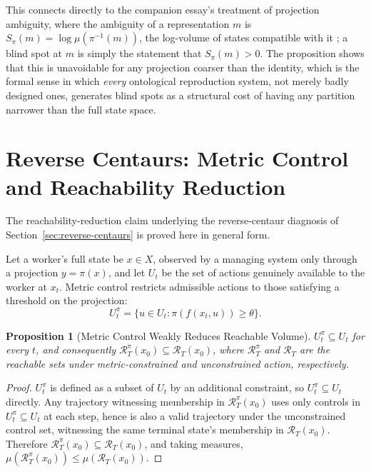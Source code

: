 \documentclass[11pt]{article}
\theoremstyle{plain}
\newtheorem{proposition}{Proposition}[section]
\begin{document}
\noindent This connects directly to the companion essay's treatment of projection ambiguity, where the ambiguity of a representation $m$ is $S_\pi(m) = \log \mu(\pi^{-1}(m))$, the log-volume of states compatible with it \cite{flyxion2026cone}; a blind spot at $m$ is simply the statement that $S_\pi(m) > 0$. The proposition shows that this is unavoidable for any projection coarser than the identity, which is the formal sense in which \emph{every} ontological reproduction system, not merely badly designed ones, generates blind spots as a structural cost of having any partition narrower than the full state space.

\section{Reverse Centaurs: Metric Control and Reachability Reduction}
\label{app:reverse-centaurs}

\noindent The reachability-reduction claim underlying the reverse-centaur diagnosis of Section~\ref{sec:reverse-centaurs} is proved here in general form.

Let a worker's full state be $x \in X$, observed by a managing system only through a projection $y = \pi(x)$, and let $U_t$ be the set of actions genuinely available to the worker at $x_t$. Metric control restricts admissible actions to those satisfying a threshold on the projection:
\[
U_t^\pi = \{u \in U_t : \pi(f(x_t,u)) \geq \theta\}.
\]

\begin{proposition}[Metric Control Weakly Reduces Reachable Volume]
$U_t^\pi \subseteq U_t$ for every $t$, and consequently $\mathcal{R}_T^\pi(x_0) \subseteq \mathcal{R}_T(x_0)$, where $\mathcal{R}_T^\pi$ and $\mathcal{R}_T$ are the reachable sets under metric-constrained and unconstrained action, respectively.
\end{proposition}
\begin{proof}
$U_t^\pi$ is defined as a subset of $U_t$ by an additional constraint, so $U_t^\pi \subseteq U_t$ directly. Any trajectory witnessing membership in $\mathcal{R}_T^\pi(x_0)$ uses only controls in $U_t^\pi \subseteq U_t$ at each step, hence is also a valid trajectory under the unconstrained control set, witnessing the same terminal state's membership in $\mathcal{R}_T(x_0)$. Therefore $\mathcal{R}_T^\pi(x_0) \subseteq \mathcal{R}_T(x_0)$, and taking measures, $\mu(\mathcal{R}_T^\pi(x_0)) \leq \mu(\mathcal{R}_T(x_0))$.
\end{proof}
\end{document}

